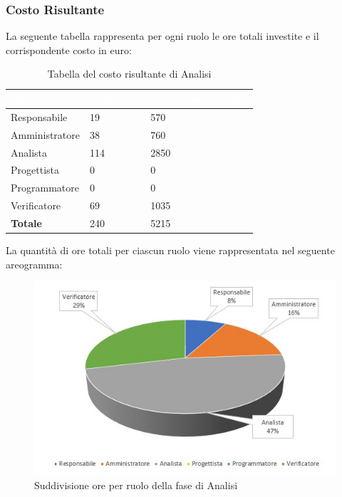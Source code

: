 \clearpage
\subsubsection{Costo Risultante}
La seguente tabella rappresenta per ogni ruolo le ore totali investite e il corrispondente costo in euro:
{
\renewcommand{\arraystretch}{2}
\centering

\begin{longtable}{ C{3cm} C{2cm} C{4cm}}
\caption{Tabella del costo risultante di Analisi}\\
	\textcolor{white}{\textbf{Ruolo}} & 
	\textcolor{white}{\textbf{Totale ore}} & 
	\textcolor{white}{\textbf{Costo ruolo in euro}}\\	
\endhead

        Responsabile & 19 & 570\\
        Amministratore & 38 & 760\\
        Analista & 114 & 2850 \\
        Progettista & 0 & 0 \\
        Programmatore & 0 & 0 \\
        Verificatore & 69 & 1035 \\
        \textbf{Totale} & 240 & 5215 \\
		
	\end{longtable}

}


La quantità di ore totali per ciascun ruolo viene rappresentata nel seguente areogramma:
\begin{figure}[h]
\centering	
	\includegraphics[scale=2.80]{Sezioni/Aerogrammi/AerogrammaAnalisi.png}
	\caption{Suddivisione ore per ruolo della fase di Analisi}
\end{figure}
\clearpage

